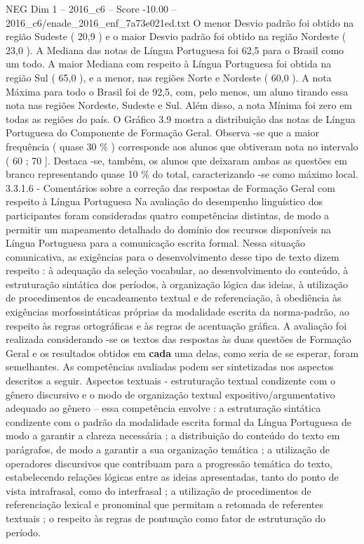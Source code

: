 \begin{textsample}{NEG Dim 1 – 2016\_c6 – Score -10.00 – 2016\_c6/enade\_2016\_enf\_7a73e021ed.txt}
O menor Desvio padrão foi obtido na região Sudeste ( 20,9 ) e o maior Desvio padrão foi obtido na região Nordeste ( 23,0 ).
A Mediana das notas de Língua Portuguesa foi 62,5 para o Brasil como um todo.
A maior Mediana com respeito à Língua Portuguesa foi obtida na região Sul ( 65,0 ), e a menor, nas regiões Norte e Nordeste ( 60,0 ).
A nota Máxima para todo o Brasil foi de 92,5, com, pelo menos, um aluno tirando essa nota nas regiões Nordeste, Sudeste e Sul.
Além disso, a nota Mínima foi zero em todas as regiões do país.
O Gráfico 3.9 mostra a distribuição das notas de Língua Portuguesa do Componente de Formação Geral.
Observa -se que a maior frequência ( quase 30 \% ) corresponde aos alunos que obtiveram nota no intervalo ( 60 ; 70 ].
Destaca -se, também, os alunos que deixaram ambas as questões em branco representando quase 10 \% do total, caracterizando -se como máximo local. 3.3.1.6 - Comentários sobre a correção das respostas de Formação Geral com respeito à Língua Portuguesa Na avaliação do desempenho linguístico dos participantes foram consideradas quatro competências distintas, de modo a permitir um mapeamento detalhado do domínio dos recursos disponíveis na Língua Portuguesa para a comunicação escrita formal.
Nessa situação comunicativa, as exigências para o desenvolvimento desse tipo de texto dizem respeito : à adequação da seleção vocabular, ao desenvolvimento do conteúdo, à estruturação sintática dos períodos, à organização lógica das ideias, à utilização de procedimentos de encadeamento textual e de referenciação, à obediência às exigências morfossintáticas próprias da modalidade escrita da norma-padrão, ao respeito às regras ortográficas e às regras de acentuação gráfica.
A avaliação foi realizada considerando -se os textos das respostas às duas questões de Formação Geral e os resultados obtidos em \textbf{cada} uma delas, como seria de se esperar, foram semelhantes.
As competências avaliadas podem ser sintetizadas nos aspectos descritos a seguir.
Aspectos textuais - estruturação textual condizente com o gênero discursivo e o modo de organização textual expositivo/argumentativo adequado ao gênero – essa competência envolve : a estruturação sintática condizente com o padrão da modalidade escrita formal da Língua Portuguesa de modo a garantir a clareza necessária ; a distribuição do conteúdo do texto em parágrafos, de modo a garantir a sua organização temática ; a utilização de operadores discursivos que contribuam para a progressão temática do texto, estabelecendo relações lógicas entre as ideias apresentadas, tanto do ponto de vista intrafrasal, como do interfrasal ; a utilização de procedimentos de referenciação lexical e pronominal que permitam a retomada de referentes textuais ; o respeito às regras de pontuação como fator de estruturação do período.

\end{textsample}

